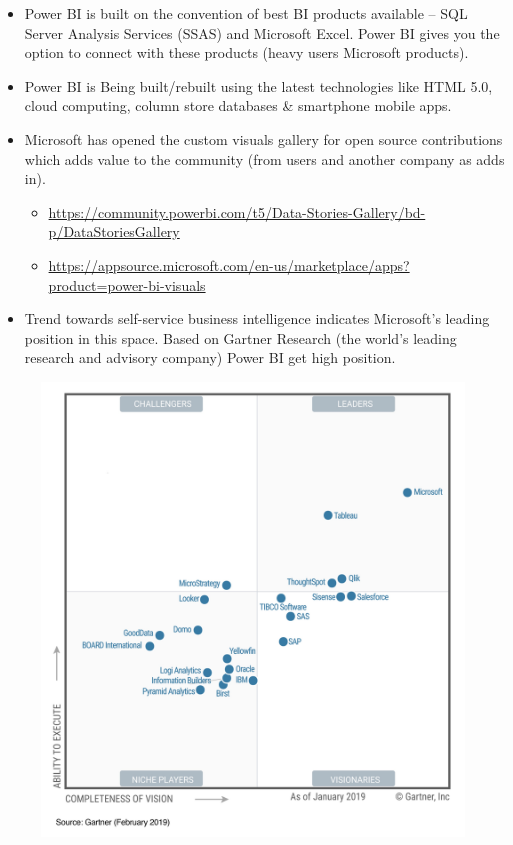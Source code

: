 \documentclass[]{book}
\providecommand{\tightlist}{%
  \setlength{\itemsep}{0pt}\setlength{\parskip}{0pt}}
\begin{document}
\begin{itemize}
\tightlist
\item
  Power BI is built on the convention of best BI products available --
  SQL Server Analysis Services (SSAS) and Microsoft Excel. Power BI
  gives you the option to connect with these products (heavy users
  Microsoft products).
\item
  Power BI is Being built/rebuilt using the latest technologies like
  HTML 5.0, cloud computing, column store databases \& smartphone mobile
  apps.
\item
  Microsoft has opened the custom visuals gallery for open source
  contributions which adds value to the community (from users and
  another company as adds in).

  \begin{itemize}
  \tightlist
  \item
    \url{https://community.powerbi.com/t5/Data-Stories-Gallery/bd-p/DataStoriesGallery}
  \item
    \url{https://appsource.microsoft.com/en-us/marketplace/apps?product=power-bi-visuals}
  \end{itemize}
\item
  Trend towards self-service business intelligence indicates Microsoft's
  leading position in this space. Based on Gartner Research (the world's
  leading research and advisory company) Power BI get high position.
\end{itemize}

\begin{figure}
\centering
\includegraphics{gartnerpowerbi.jpg}
\caption{}
\end{figure}
\end{document}
